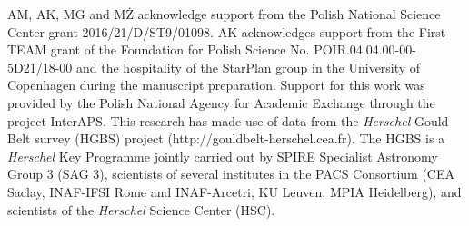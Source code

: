 \documentclass{aa}
\begin{document}
\begin{acknowledgements} AM, AK, MG and MŻ acknowledge support from the Polish National Science
Center grant 2016/21/D/ST9/01098. AK acknowledges support from the First TEAM grant of 
the Foundation for Polish Science No. POIR.04.04.00-00-5D21/18-00 and the hospitality 
of the StarPlan group in the University of Copenhagen during the manuscript preparation.
Support for this work was provided by the Polish National Agency for Academic Exchange through the project InterAPS.
This research has made use of data from the \textit{Herschel} Gould Belt survey (HGBS) project
(http://gouldbelt-herschel.cea.fr). The HGBS is a \textit{Herschel} Key Programme jointly carried out by
SPIRE Specialist Astronomy Group 3 (SAG 3), scientists of several institutes in the PACS Consortium
(CEA Saclay, INAF-IFSI Rome and INAF-Arcetri, KU Leuven, MPIA Heidelberg), and scientists of the
\textit{Herschel} Science Center (HSC). 
\end{acknowledgements}


\end{document}
